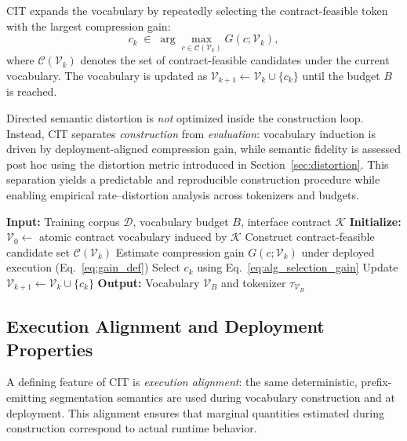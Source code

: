 CIT expands the vocabulary by repeatedly selecting the contract-feasible token with the largest compression gain:
\begin{equation}
c_k
\;\in\;
\arg\max_{c \in \mathcal{C}(\mathcal{V}_k)}
G(c;\mathcal{V}_k),
\label{eq:alg_selection_gain}
\end{equation}
where $\mathcal{C}(\mathcal{V}_k)$ denotes the set of contract-feasible candidates under the current vocabulary.
The vocabulary is updated as $\mathcal{V}_{k+1} \leftarrow \mathcal{V}_k \cup \{c_k\}$ until the budget $B$ is reached.

Directed semantic distortion is \emph{not} optimized inside the construction loop.
Instead, CIT separates \emph{construction} from \emph{evaluation}: vocabulary induction is driven by deployment-aligned compression gain, while semantic fidelity is assessed post hoc using the distortion metric introduced in Section~\ref{sec:distortion}.
This separation yields a predictable and reproducible construction procedure while enabling empirical rate--distortion analysis across tokenizers and budgets.

\begin{algorithm}[t]
\caption{Controlled Interface Tokenization (CIT)}
\label{alg:cit}
\begin{algorithmic}[1]
\State \textbf{Input:} Training corpus $\mathcal{D}$, vocabulary budget $B$, interface contract $\mathcal{K}$
\State \textbf{Initialize:} $\mathcal{V}_0 \leftarrow$ atomic contract vocabulary induced by $\mathcal{K}$
    \State Construct contract-feasible candidate set $\mathcal{C}(\mathcal{V}_k)$
        \State Estimate compression gain $G(c;\mathcal{V}_k)$ under deployed execution (Eq.~\eqref{eq:gain_def})
    \EndFor
    \State Select $c_k$ using Eq.~\eqref{eq:alg_selection_gain}
    \State Update $\mathcal{V}_{k+1} \leftarrow \mathcal{V}_k \cup \{c_k\}$
\EndFor
\State \textbf{Output:} Vocabulary $\mathcal{V}_B$ and tokenizer $\tau_{\mathcal{V}_B}$
\end{algorithmic}
\end{algorithm}

\subsection{Execution Alignment and Deployment Properties}
\label{sec:properties}

A defining feature of CIT is \emph{execution alignment}: the same deterministic, prefix-emitting segmentation semantics are used during vocabulary construction and at deployment.
This alignment ensures that marginal quantities estimated during construction correspond to actual runtime behavior.

